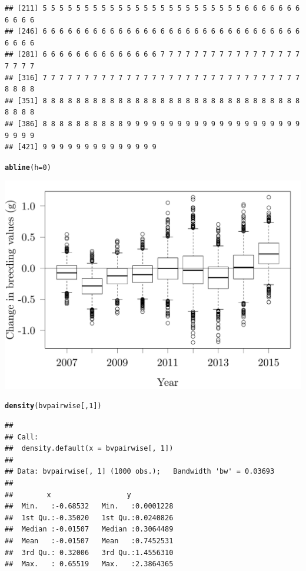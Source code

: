 \documentclass{article}\usepackage[]{graphicx}\usepackage[]{color}
\makeatletter
\def\maxwidth{ %
  \ifdim\Gin@nat@width>\linewidth
    \linewidth
  \else
    \Gin@nat@width
  \fi
}
\newcommand{\hlnum}[1]{\textcolor[rgb]{0.686,0.059,0.569}{#1}}%
\newcommand{\hlstd}[1]{\textcolor[rgb]{0.345,0.345,0.345}{#1}}%
\newcommand{\hlkwc}[1]{\textcolor[rgb]{0.333,0.667,0.333}{#1}}%
\newcommand{\hlkwd}[1]{\textcolor[rgb]{0.737,0.353,0.396}{\textbf{#1}}}%
\newenvironment{kframe}{%
 \def\at@end@of@kframe{}%
 \ifinner\ifhmode%
  \def\at@end@of@kframe{\end{minipage}}%
  \begin{minipage}{\columnwidth}%
 \fi\fi%
 \def\FrameCommand##1{\hskip\@totalleftmargin \hskip-\fboxsep
 \colorbox{shadecolor}{##1}\hskip-\fboxsep
     \hskip-\linewidth \hskip-\@totalleftmargin \hskip\columnwidth}%
 \MakeFramed {\advance\hsize-\width
   \@totalleftmargin\z@ \linewidth\hsize
   \@setminipage}}%
 {\par\unskip\endMakeFramed%
 \at@end@of@kframe}
\newenvironment{knitrout}{}{} %
\makeatother
\begin{document}
\begin{knitrout}
\begin{kframe}
\begin{verbatim}
## [211] 5 5 5 5 5 5 5 5 5 5 5 5 5 5 5 5 5 5 5 5 5 5 5 5 6 6 6 6 6 6 6 6 6 6 6
## [246] 6 6 6 6 6 6 6 6 6 6 6 6 6 6 6 6 6 6 6 6 6 6 6 6 6 6 6 6 6 6 6 6 6 6 6
## [281] 6 6 6 6 6 6 6 6 6 6 6 6 6 6 7 7 7 7 7 7 7 7 7 7 7 7 7 7 7 7 7 7 7 7 7
## [316] 7 7 7 7 7 7 7 7 7 7 7 7 7 7 7 7 7 7 7 7 7 7 7 7 7 7 7 7 7 7 7 8 8 8 8
## [351] 8 8 8 8 8 8 8 8 8 8 8 8 8 8 8 8 8 8 8 8 8 8 8 8 8 8 8 8 8 8 8 8 8 8 8
## [386] 8 8 8 8 8 8 8 8 8 8 9 9 9 9 9 9 9 9 9 9 9 9 9 9 9 9 9 9 9 9 9 9 9 9 9
## [421] 9 9 9 9 9 9 9 9 9 9 9 9 9 9
\end{verbatim}
\begin{alltt}
\hlkwd{abline}\hlstd{(}\hlkwc{h}\hlstd{=}\hlnum{0}\hlstd{)}
\end{alltt}
\end{kframe}
\includegraphics[width=\maxwidth]{figure/EvolDiff-1} 
\begin{kframe}\begin{alltt}
\hlkwd{density}\hlstd{(bvpairwise[,}\hlnum{1}\hlstd{])}
\end{alltt}
\begin{verbatim}
## 
## Call:
## 	density.default(x = bvpairwise[, 1])
## 
## Data: bvpairwise[, 1] (1000 obs.);	Bandwidth 'bw' = 0.03693
## 
##        x                  y            
##  Min.   :-0.68532   Min.   :0.0001228  
##  1st Qu.:-0.35020   1st Qu.:0.0240826  
##  Median :-0.01507   Median :0.3064489  
##  Mean   :-0.01507   Mean   :0.7452531  
##  3rd Qu.: 0.32006   3rd Qu.:1.4556310  
##  Max.   : 0.65519   Max.   :2.3864365
\end{verbatim}
\end{kframe}
\end{knitrout}
\end{document}
